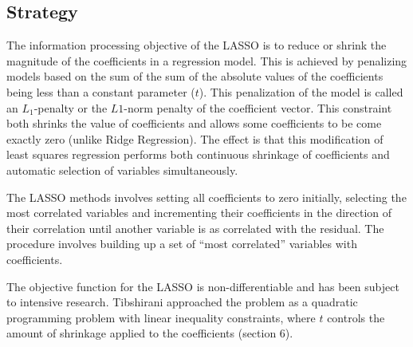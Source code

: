 \subsection{Strategy}
The information processing objective of the LASSO is to reduce or shrink the magnitude of the coefficients in a regression model.
This is achieved by penalizing models based on the sum of the sum of the absolute values of the coefficients being less than a constant parameter ($t$). This penalization of the model is called an $L_1$-penalty or the $L1$-norm penalty of the coefficient vector. This constraint both shrinks the value of coefficients and allows some coefficients to be come exactly zero (unlike Ridge Regression). The effect is that this modification of least squares regression performs both continuous shrinkage of coefficients and automatic selection of variables simultaneously. 

The LASSO methods involves setting all coefficients to zero initially, selecting the most correlated variables and incrementing their coefficients in the direction of their correlation until another variable is as correlated with the residual. The procedure involves building up a set of ``most correlated'' variables with coefficients.

The objective function for the LASSO is non-differentiable and has been subject to intensive research. Tibshirani approached the problem as a quadratic programming problem with linear inequality constraints, where $t$ controls the amount of shrinkage applied to the coefficients \cite{Tibshirani1996} (section 6).

